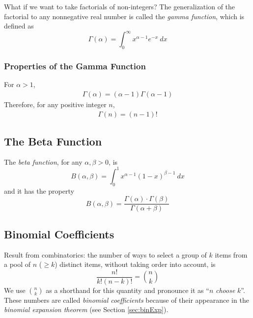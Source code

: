 What if we want to take factorials of non-integers? The generalization of the factorial to any nonnegative real number 
is called the \textit{gamma function}, which is defined as
\begin{equation*}
    \Gamma(\alpha) = \int_0^\infty x^{\alpha - 1} e^{-x}\ dx
\end{equation*}

\subsubsection{Properties of the Gamma Function}

For $\alpha > 1$,
\begin{equation*}
    \begin{aligned}
        \Gamma(\alpha) = (\alpha - 1) \Gamma(\alpha - 1)
    \end{aligned}
\end{equation*}
Therefore, for any positive integer $n$,
\begin{equation*}
    \begin{aligned}
        \Gamma(n) = (n - 1)!
    \end{aligned}
\end{equation*}

\subsection{The Beta Function}

The \textit{beta function}, for any $\alpha, \beta > 0$, is 
\begin{equation*}
    B(\alpha, \beta) = \int_0^1 x^{\alpha - 1} (1-x)^{\beta - 1}\ dx
\end{equation*}
and it has the property
\begin{equation*}
    B(\alpha, \beta) = \frac{\Gamma(\alpha) \cdot \Gamma{(\beta)}}{\Gamma(\alpha + \beta)}
\end{equation*}

\subsection{Binomial Coefficients}

Result from combinatorics: the number of ways to select a group of $k$ items from a pool of $n$ ($\geq k$) distinct items, without taking order into account, is 
\begin{equation*}
    \frac{n!}{k! (n - k)!} = \binom{n}{k}
\end{equation*}
We use $\binom{n}{k}$ as a shorthand for this quantity and pronounce it as ``$n$ \textit{choose} $k$''. These numbers are called \textit{binomial coefficients} because of their 
appearance in the \textit{binomial expansion theorem} (see Section \ref{sec:binExp}).

